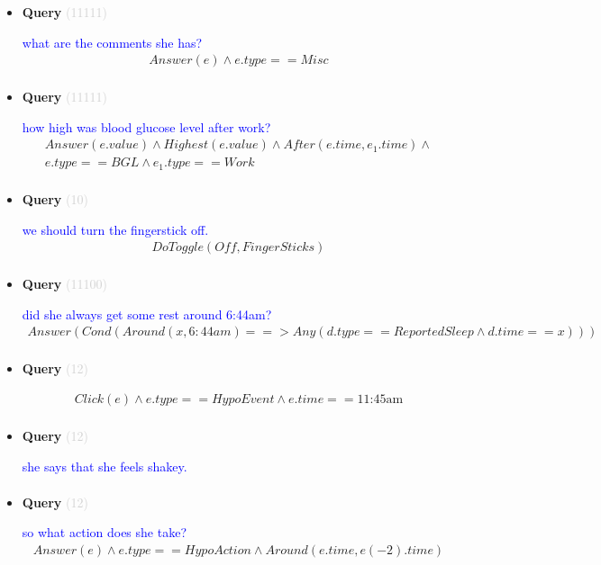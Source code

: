 \documentclass[11pt]{article}
\newcommand{\key}[1]{\textcolor{lightgray}{#1}}
\newcounter{CQuery}
\begin{document}
\begin{itemize}
\item
\textbf{Query\theCQuery} \key{(11111)} \addtocounter{CQuery}{1}
\textcolor{blue}{ what are the comments she has? }
\begin{multline*}
Answer(e) \wedge e.type==Misc \\ 
\end{multline*}


\item
\textbf{Query\theCQuery} \key{(11111)} \addtocounter{CQuery}{1}
\textcolor{blue}{ how high was blood glucose level after work? }
\begin{multline*}
Answer(e.value) \wedge Highest(e.value) \wedge After(e.time, e_1.time) \wedge \\ 
e.type==BGL \wedge e_1.type==Work \\ 
\end{multline*}


\item
\textbf{Query\theCQuery} \key{(10)} \addtocounter{CQuery}{1}
\textcolor{blue}{ we should turn the fingerstick off. }
\begin{multline*}
DoToggle(Off, FingerSticks) \\ 
\end{multline*}


\item
\textbf{Query\theCQuery} \key{(11100)} \addtocounter{CQuery}{1}
\textcolor{blue}{ did she always get some rest around 6:44am? }
\begin{multline*}
Answer(Cond(Around(x, 6:44am) ==> Any(d.type==ReportedSleep \wedge d.time==x))) \\ 
\end{multline*}


\item
\textbf{Query\theCQuery} \key{(12)} \addtocounter{CQuery}{1}
\textcolor{blue}{  }
\begin{multline*}
Click(e) \wedge e.type == HypoEvent \wedge e.time == \mbox{11:45am} \\ 
\end{multline*}


\item
\textbf{Query\theCQuery} \key{(12)} \addtocounter{CQuery}{1}
\textcolor{blue}{ she says that she feels shakey. }
\begin{multline*}
\end{multline*}


\item
\textbf{Query\theCQuery} \key{(12)} \addtocounter{CQuery}{1}
\textcolor{blue}{ so what action does she take? }
\begin{multline*}
Answer(e) \wedge e.type == HypoAction \wedge Around(e.time, e(-2).time) \\ 
\end{multline*}



\end{itemize}
\end{document}
